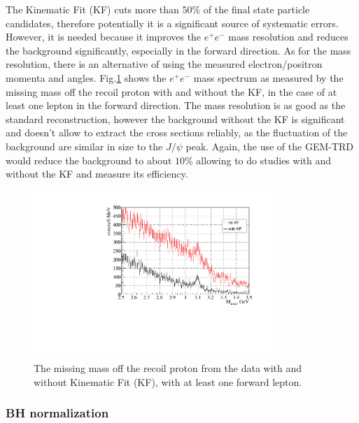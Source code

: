 \documentclass[%
preprint,
nofootinbib,
 amsmath,amssymb,
 aps,
floatfix,
]{revtex4-1}
\begin{document}
The Kinematic Fit (KF) cuts more than $50$\% of the final state particle candidates,
therefore potentially it is a significant source of systematic errors.
However, it is needed because it improves the $e^+e^-$ mass resolution
and reduces the background significantly, especially in the forward direction.
As for the mass resolution, 
there is an alternative of using the measured electron/positron
momenta and angles. 
Fig.\ref{fig:mrec} shows the $e^+e^-$ mass spectrum as measured by
the missing mass off the recoil proton with and without the KF,
in the case of at least one lepton in the forward direction.
The mass resolution is as good as the standard reconstruction,
however the background without
the KF is significant and doesn't allow to extract the cross sections
reliably, as the fluctuation of the background are similar in size 
to the $J/\psi $ peak.
Again, the use of the GEM-TRD would reduce the background to about $10$\%
allowing to do studies with and without the KF and measure its efficiency.
\begin{figure}[]
\includegraphics[width=0.80\textwidth]{./fig/GEM_TRD_Minv_no_with_KF.pdf}
  \caption{
The missing mass off the recoil proton from the data 
with and without Kinematic Fit (KF), with at least one forward lepton.
}
  \label{fig:mrec}
\end{figure}

\subsubsection{BH normalization}
\end{document}
